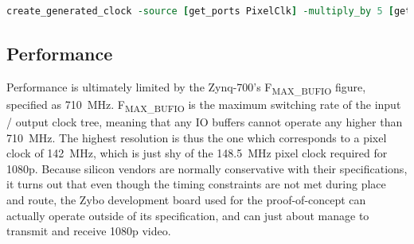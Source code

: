 \begin{lstlisting}[caption={Serial clock timing constraints}, label={lst:timing_constraints}, language=tcl]
create_generated_clock -source [get_ports PixelClk] -multiply_by 5 [get_ports SerialClk]
\end{lstlisting}

\subsection{Performance}
Performance is ultimately limited by the Zynq-700's F\textsubscript{MAX\_BUFIO} figure, specified as \SI{710}{\mega\hertz}\cite{xilinx:ds187}. F\textsubscript{MAX\_BUFIO} is the maximum switching rate of the input / output clock tree, meaning that any IO buffers cannot operate any higher than \SI{710}{\mega\hertz}. The highest resolution is thus the one which corresponds to a pixel clock of \SI{142}{\mega\hertz}, which is just shy of the \SI{148.5}{\mega\hertz} pixel clock required for 1080p. Because silicon vendors are normally conservative with their specifications, it turns out that even though the timing constraints are not met during place and route, the Zybo development board used for the proof-of-concept can actually operate outside of its specification, and can just about manage to transmit and receive 1080p video.